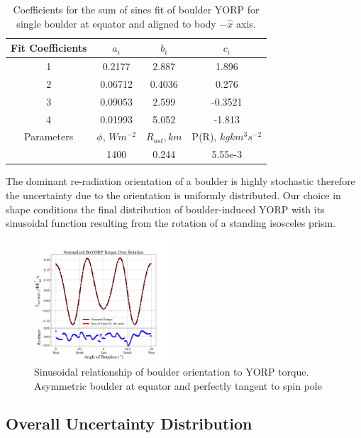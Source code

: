 \begin{table}[H]
    \centering
    \begin{tabular}{|c|c|c|c|}
        \hline
        Fit Coefficients &$a_i$ & $b_i$ & $c_i$ \\
        \hline
        1 & 0.2177 & 2.887 & 1.896 \\
        2 & 0.06712 & 0.4036 & 0.276 \\
        3 & 0.09053 & 2.599 & -0.3521 \\
        4 & 0.01993 & 5.052 & -1.813 \\
        \hline
        Parameters & $\phi$,  $W m^{-2}$ & $R_{ast}, km$  & P(R), $kg km^3 s^{-2}$ \\
        \hline
         & 1400& 0.244 & 5.55e-3  \\
         \hline
    \end{tabular}
    \caption{Coefficients for the sum of sines fit of boulder YORP for single boulder at equator and aligned to body $-\hat{x}$ axis.}
    \label{coeffs}
\end{table}
The dominant re-radiation orientation of a boulder is highly stochastic therefore the uncertainty due to the orientation is uniformly distributed. Our choice in shape conditions the final distribution of boulder-induced YORP with its sinusoidal function resulting from the rotation of a standing isosceles prism. 

\begin{figure}
    \centering
    \includegraphics[width=0.45\textwidth]{fig/rotation_plot_one_equator_boulder.png}
    \caption{Sinusoidal relationship of boulder orientation to YORP torque. Asymmetric boulder at equator and perfectly tangent to spin pole}
    \label{fig:sine}
\end{figure}


\subsection{Overall Uncertainty Distribution}

